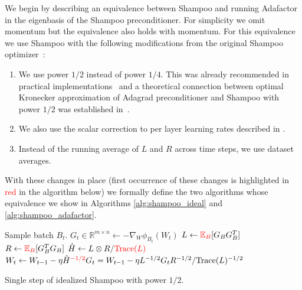 \documentclass{article} %
\newcommand{\red}[1]{\textcolor{red}{#1}}
\begin{document}
We begin by describing an equivalence between Shampoo and running Adafactor in the eigenbasis of the Shampoo preconditioner. For simplicity we omit momentum but the equivalence also holds with momentum. For this equivalence we  use Shampoo with the following modifications from the original Shampoo optimizer~\citep{shampoo}:
\begin{enumerate}
	\item We  use power $1/2$ instead of power $1/4$. This was already recommended in practical implementations~\citep{anil2020scalable,distributedshampoo} and a theoretical connection between optimal Kronecker approximation of Adagrad \citep{adagrad} preconditioner and Shampoo with power $1/2$ was established in~\cite{whyshampoo}. 
	\item  We also use the scalar correction to per layer learning rates described in \citet{yi21,whyshampoo}.
	\item Instead of the running average of $L$ and $R$ across time steps, we use dataset averages.
\end{enumerate}

With these changes in place (first occurrence of these changes is highlighted in \red{red} in the algorithm below) we formally define the two algorithms whose equivalence we  show in Algorithms \ref{alg:shampoo_ideal} and \ref{alg:shampoo_adafactor}.

\begin{algorithm}[H]
	
	\begin{algorithmic}[1]
		\STATE Sample batch $B_t$.
		\STATE $G_{t} \in \mathbb{R}^{m \times n} \gets -\nabla_W \phi_{B_t}(W_t)$
		\STATE $L \gets \red{\E_{B}}[G_{B}G_{B}^T]$ 
		\STATE $R \gets \red{\E_{B}}[G_{B}^TG_{B}]$
		\STATE $\hat{H} \gets L \otimes R / \red{\text{Trace}(L)}$
		\STATE $W_t \gets W_{t-1} - \eta \hat{H}^{\red{-1/2}}G_{t} = W_{t-1} - \eta L^{-1/2}G_{t}R^{-1/2}/ \text{Trace}(L)^{-1/2}$
	\end{algorithmic}
	\caption{Single step of idealized Shampoo with power $1/2$.}
	\label{alg:shampoo_ideal}
\end{algorithm}
\end{document}
